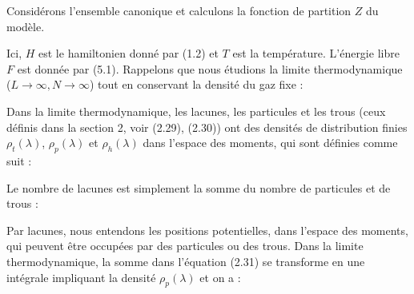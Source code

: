 Considérons l'ensemble canonique et calculons la fonction de partition $Z$ du modèle.

Ici, $H$ est le hamiltonien donné par (1.2) et $T$ est la température.  
L'énergie libre $F$ est donnée par (5.1). Rappelons que nous étudions  
la limite thermodynamique ($L \to \infty, N \to \infty$) tout en conservant  
la densité du gaz fixe :

Dans la limite thermodynamique, les lacunes, les particules et les trous  
(ceux définis dans la section 2, voir (2.29), (2.30)) ont des densités de  
distribution finies $\rho_t(\lambda)$, $\rho_p(\lambda)$ et $\rho_h(\lambda)$  
dans l'espace des moments, qui sont définies comme suit :

Le nombre de lacunes est simplement la somme du nombre de particules  
et de trous :

Par lacunes, nous entendons les positions potentielles, dans l'espace des moments,  
qui peuvent être occupées par des particules ou des trous. Dans la limite thermodynamique,  
la somme dans l'équation (2.31) se transforme en une intégrale impliquant la densité $\rho_p(\lambda)$  
et on a :
